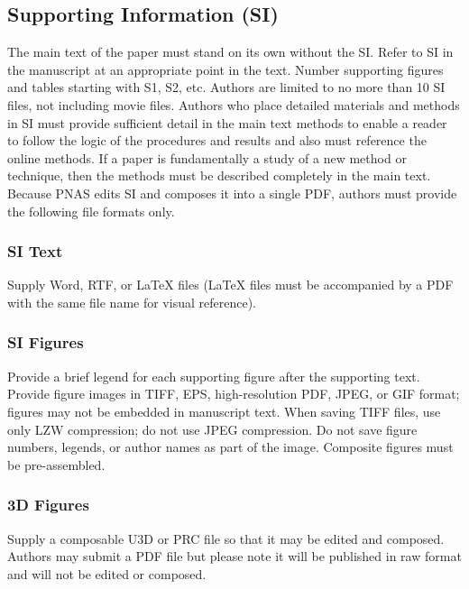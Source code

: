\documentclass[9pt,twocolumn,twoside,]{pnas-new}
\begin{document}
\hypertarget{supporting-information-si}{%
\subsection{Supporting Information
(SI)}\label{supporting-information-si}}

The main text of the paper must stand on its own without the SI. Refer
to SI in the manuscript at an appropriate point in the text. Number
supporting figures and tables starting with S1, S2, etc. Authors are
limited to no more than 10 SI files, not including movie files. Authors
who place detailed materials and methods in SI must provide sufficient
detail in the main text methods to enable a reader to follow the logic
of the procedures and results and also must reference the online
methods. If a paper is fundamentally a study of a new method or
technique, then the methods must be described completely in the main
text. Because PNAS edits SI and composes it into a single PDF, authors
must provide the following file formats only.

\hypertarget{si-text}{%
\subsubsection{SI Text}\label{si-text}}

Supply Word, RTF, or LaTeX files (LaTeX files must be accompanied by a
PDF with the same file name for visual reference).

\hypertarget{si-figures}{%
\subsubsection{SI Figures}\label{si-figures}}

Provide a brief legend for each supporting figure after the supporting
text. Provide figure images in TIFF, EPS, high-resolution PDF, JPEG, or
GIF format; figures may not be embedded in manuscript text. When saving
TIFF files, use only LZW compression; do not use JPEG compression. Do
not save figure numbers, legends, or author names as part of the image.
Composite figures must be pre-assembled.

\hypertarget{d-figures}{%
\subsubsection{3D Figures}\label{d-figures}}

Supply a composable U3D or PRC file so that it may be edited and
composed. Authors may submit a PDF file but please note it will be
published in raw format and will not be edited or composed.
\end{document}
